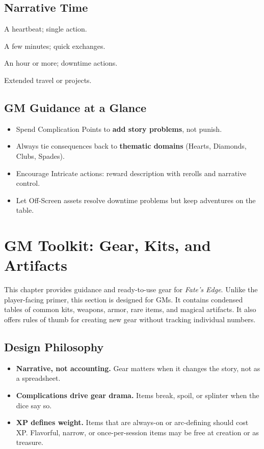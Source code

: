 \documentclass[12pt]{book}
\begin{document}
\section*{Narrative Time}
\begin{description}[leftmargin=2cm]
  \item[A Moment] A heartbeat; single action.  
  \item[Some Time] A few minutes; quick exchanges.  
  \item[Significant Time] An hour or more; downtime actions.  
  \item[Days] Extended travel or projects.  
\end{description}

\section*{GM Guidance at a Glance}
\begin{itemize}
  \item Spend Complication Points to \textbf{add story problems}, not punish.  
  \item Always tie consequences back to \textbf{thematic domains} (Hearts, Diamonds, Clubs, Spades).  
  \item Encourage Intricate actions: reward description with rerolls and narrative control.  
  \item Let Off-Screen assets resolve downtime problems but keep adventures on the table.  
\end{itemize}

\chapter{GM Toolkit: Gear, Kits, and Artifacts}

This chapter provides guidance and ready-to-use gear for \textit{Fate’s Edge}.  
Unlike the player-facing primer, this section is designed for GMs.  
It contains condensed tables of common kits, weapons, armor, rare items, and magical artifacts.  
It also offers rules of thumb for creating new gear without tracking individual numbers.

\section{Design Philosophy}
\begin{itemize}
  \item \textbf{Narrative, not accounting.} Gear matters when it changes the story, not as a spreadsheet.
  \item \textbf{Complications drive gear drama.} Items break, spoil, or splinter when the dice say so.
  \item \textbf{XP defines weight.} Items that are always-on or arc-defining should cost XP.  
  Flavorful, narrow, or once-per-session items may be free at creation or as treasure.
\end{itemize}
\end{document}
